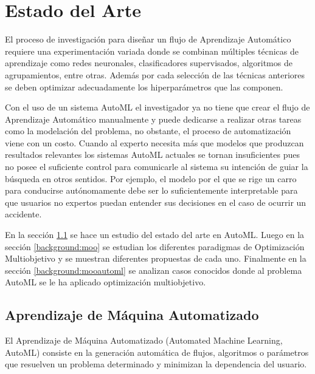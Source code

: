 \chapter{Estado del Arte}\label{chapter:state-of-the-art}
El proceso de investigaci\'on para dise\~nar un flujo de Aprendizaje Autom\'atico requiere una experimentaci\'on variada donde se combinan m\'ultiples t\'ecnicas de aprendizaje como redes neuronales, clasificadores supervisados, algoritmos de agrupamientos, entre otras. Adem\'as por cada selecci\'on de las t\'ecnicas anteriores se deben optimizar adecuadamente los hiperpar\'ametros que las componen.

Con el uso de un sistema AutoML el investigador ya no tiene que crear el flujo de Aprendizaje Autom\'atico manualmente y puede dedicarse a realizar otras tareas como la modelaci\'on del problema, no obstante, el proceso de automatizaci\'on viene con un costo. Cuando al experto necesita m\'as que modelos que produzcan resultados relevantes los sistemas AutoML actuales se tornan insuficientes pues no posee el suficiente control para comunicarle al sistema su intenci\'on de guiar la b\'usqueda en otros sentidos. Por ejemplo, el modelo por el que se rige un carro para conducirse aut\'onomamente debe ser lo suficientemente interpretable para que usuarios no expertos puedan entender sus decisiones en el caso de ocurrir un accidente.

En la secci\'on \ref{background:automl} se  hace un estudio del estado del arte en AutoML. Luego en la secci\'on \ref{background:moo} se estudian los diferentes paradigmas de Optimizaci\'on Multiobjetivo y se muestran diferentes propuestas de cada uno. Finalmente en la secci\'on \ref{background:mooautoml} se analizan casos conocidos donde al problema AutoML se le ha aplicado optimizaci\'on multiobjetivo.

\section{Aprendizaje de M\'aquina Automatizado}\label{background:automl}
El Aprendizaje de M\'aquina Automatizado (Automated Machine Learning, AutoML) consiste en la generaci\'on autom\'atica de flujos, algoritmos o par\'ametros que resuelven un problema determinado y minimizan la dependencia del usuario. 


